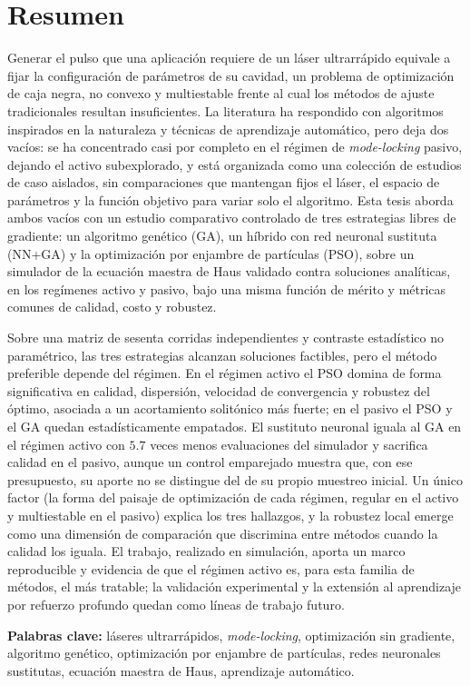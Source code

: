 \chapter*{Resumen}

Generar el pulso que una aplicación requiere de un láser ultrarrápido equivale a fijar la
configuración de parámetros de su cavidad, un problema de optimización de caja negra, no
convexo y multiestable frente al cual los métodos de ajuste tradicionales resultan
insuficientes. La literatura ha respondido con algoritmos inspirados en la naturaleza y
técnicas de aprendizaje automático, pero deja dos vacíos: se ha concentrado casi por
completo en el régimen de \emph{mode-locking} pasivo, dejando el activo subexplorado, y
está organizada como una colección de estudios de caso aislados, sin comparaciones que
mantengan fijos el láser, el espacio de parámetros y la función objetivo para variar solo
el algoritmo. Esta tesis aborda ambos vacíos con un estudio comparativo controlado de tres
estrategias libres de gradiente: un algoritmo genético (GA), un híbrido con red neuronal
sustituta (NN+GA) y la optimización por enjambre de partículas (PSO), sobre un simulador de
la ecuación maestra de Haus validado contra soluciones analíticas, en los regímenes activo
y pasivo, bajo una misma función de mérito y métricas comunes de calidad, costo y robustez.

Sobre una matriz de sesenta corridas independientes y contraste estadístico no paramétrico,
las tres estrategias alcanzan soluciones factibles, pero el método preferible depende del
régimen. En el régimen activo el PSO domina de forma significativa en
calidad, dispersión, velocidad de convergencia y robustez del óptimo, asociada a un
acortamiento solitónico más fuerte; en el pasivo el PSO y
el GA quedan estadísticamente empatados. El sustituto neuronal iguala al GA en el régimen
activo con $5{.}7$ veces menos evaluaciones del simulador y sacrifica calidad en el pasivo,
aunque un control emparejado muestra que, con ese presupuesto, su aporte no se distingue
del de su propio muestreo inicial. Un único factor (la forma
del paisaje de optimización de cada régimen, regular en el activo y multiestable en el
pasivo) explica los tres hallazgos, y la robustez local emerge como una dimensión de
comparación que discrimina entre métodos cuando la calidad los iguala. El trabajo, realizado
en simulación, aporta un marco reproducible y evidencia de que el régimen activo es, para
esta familia de métodos, el más tratable; la validación experimental y la extensión al
aprendizaje por refuerzo profundo quedan como líneas de trabajo futuro.

\vspace{1em}
\noindent\textbf{Palabras clave:} láseres ultrarrápidos, \emph{mode-locking}, optimización
sin gradiente, algoritmo genético, optimización por enjambre de partículas, redes neuronales
sustitutas, ecuación maestra de Haus, aprendizaje automático.
